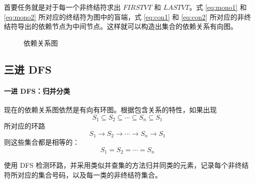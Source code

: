 \documentclass[UTF8]{ctexart}
\begin{document}
首要任务就是对于每一个非终结符求出 $\textit{FIRSTVT}$ 和 $\textit{LASTVT}$。式 \eqref{eq:mono1} 和 \eqref{eq:mono2} 所对应的终结符为图中的盲端，式 \eqref{eq:con1} 和 \eqref{eq:con2} 所对应的非终结符导出的依赖节点为中间节点。这样就可以构造出集合的依赖关系有向图。

\begin{figure}[h]
    \centering
    \caption{依赖关系图}
\end{figure}

\subsection{三进 DFS}

\paragraph{一进 DFS：归并分类} 现在的依赖关系图依然是有向有环图。根据包含关系的特性，如果出现
\begin{equation*}
    S_1 \subseteq S_2 \subseteq \cdots \subseteq S_n \subseteq S_1
\end{equation*}
所对应的环路
\begin{equation*}
    S_1 \rightarrow S_2 \rightarrow \cdots \rightarrow S_n \rightarrow S_1
\end{equation*}
则这些集合都是相等的：
\begin{equation*}
    S_1 = S_2 = \cdots = S_n
\end{equation*}

使用 DFS 检测环路，并采用类似并查集的方法归并同类的元素，记录每个非终结符所对应的集合号码，以及每一类的非终结符集合。

\begin{table}[h]
    \centering
    \caption{类别号码}\label{tab:num}
\end{table}
\end{document}

